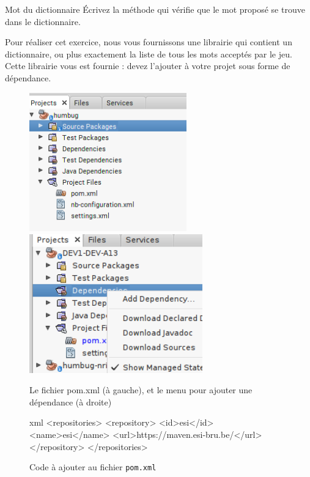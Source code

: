 \documentclass[a4paper,11pt]{style-esi/td}
\begin{document}
 	\begin{Exercice}{Mot du dictionnaire}
 	 			\'Ecrivez la méthode 
		qui vérifie que le mot proposé se trouve dans le dictionnaire.
				
		Pour réaliser cet exercice, nous vous fournissons une librairie qui contient 
		un dictionnaire, ou plus exactement la liste de tous les mots
		acceptés par le jeu. Cette librairie vous est fournie : devez l'ajouter à votre projet sous forme de dépendance.
		 
                \begin{figure}[hb]\centering
                \includegraphics[height=6cm]{resources/whereIsPom}
                \includegraphics[height=6cm]{resources/add-dependency-1}
                \caption{\label{pompompom}Le fichier pom.xml (à gauche), et le menu pour ajouter une dépendance (à droite)}
              \end{figure}

                  \begin{figure}[hb]
                    \centering
                    \begin{Code}[basicstyle=\ttfamily]{xml}%
                    <repositories>
                        <repository>
                            <id>esi</id>
                            <name>esi</name>
                            <url>https://maven.esi-bru.be/</url>
                        </repository>
                    </repositories>
                  \end{Code}
                  \caption{Code à ajouter au fichier \texttt{pom.xml}}
                  \label{pomrepository}
                \end{figure}



\end{Exercice}
\end{document}
